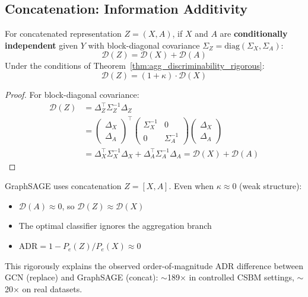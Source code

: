 \subsection{Concatenation: Information Additivity}
\label{subsec:concat_rigorous}

\begin{theorem}
\label{thm:concat_discriminability}
For concatenated representation $Z = (X, A)$, if $X$ and $A$ are \textbf{conditionally independent} given $Y$ with block-diagonal covariance $\Sigma_Z = \mathrm{diag}(\Sigma_X, \Sigma_A)$:
\begin{equation}
    \mathcal{D}(Z) = \mathcal{D}(X) + \mathcal{D}(A)
\end{equation}
Under the conditions of Theorem~\ref{thm:agg_discriminability_rigorous}:
\begin{equation}
    \mathcal{D}(Z) = (1 + \kappa) \cdot \mathcal{D}(X)
\end{equation}
\end{theorem}

\begin{proof}
For block-diagonal covariance:
\begin{align}
    \mathcal{D}(Z) &= \Delta_Z^\top \Sigma_Z^{-1} \Delta_Z \\
    &= \begin{pmatrix} \Delta_X \\ \Delta_A \end{pmatrix}^\top \begin{pmatrix} \Sigma_X^{-1} & 0 \\ 0 & \Sigma_A^{-1} \end{pmatrix} \begin{pmatrix} \Delta_X \\ \Delta_A \end{pmatrix} \\
    &= \Delta_X^\top \Sigma_X^{-1} \Delta_X + \Delta_A^\top \Sigma_A^{-1} \Delta_A = \mathcal{D}(X) + \mathcal{D}(A)
\end{align}
\end{proof}

\begin{corollary}
\label{cor:sage_rigorous}
GraphSAGE uses concatenation $Z = [X, A]$. Even when $\kappa \approx 0$ (weak structure):
\begin{itemize}
    \item $\mathcal{D}(A) \approx 0$, so $\mathcal{D}(Z) \approx \mathcal{D}(X)$
    \item The optimal classifier ignores the aggregation branch
    \item $\mathrm{ADR} = 1 - P_e(Z)/P_e(X) \approx 0$
\end{itemize}
This rigorously explains the observed order-of-magnitude ADR difference between GCN (replace) and GraphSAGE (concat): $\sim$189$\times$ in controlled CSBM settings, $\sim$20$\times$ on real datasets.
\end{corollary}

